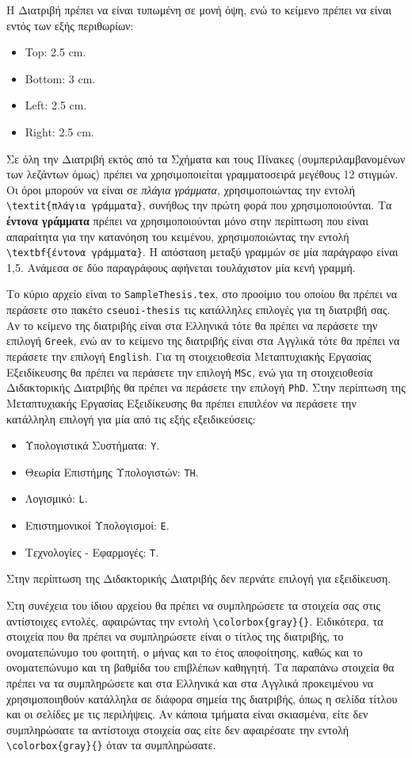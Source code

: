 Η Διατριβή πρέπει να είναι τυπωμένη σε μονή όψη, ενώ το κείμενο πρέπει να είναι εντός των εξής περιθωρίων:
\begin{itemize}
	\item Top: 2.5 cm.
	\item Bottom: 3 cm.
	\item Left: 2.5 cm.
	\item Right: 2.5 cm.
\end{itemize}
Σε όλη την Διατριβή εκτός από τα Σχήματα και τους Πίνακες (συμπεριλαμβανομένων των λεζάντων όμως) πρέπει να χρησιμοποιείται γραμματοσειρά μεγέθους 12 στιγμών.
Οι όροι μπορούν να είναι σε \textit{πλάγια γράμματα}, χρησιμοποιώντας την εντολή \verb|\textit{πλάγια γράμματα}|, συνήθως την πρώτη φορά που χρησιμοποιούνται.
Τα \textbf{έντονα γράμματα} πρέπει να χρησιμοποιούνται μόνο στην περίπτωση που είναι απαραίτητα για την κατανόηση του κειμένου, χρησιμοποιώντας την εντολή \verb|\textbf{έντονα γράμματα}|.
{\color{red}Η απόσταση μεταξύ γραμμών σε μία παράγραφο είναι 1,5.
Ανάμεσα σε δύο παραγράφους αφήνεται τουλάχιστον μία κενή γραμμή.}

Το κύριο αρχείο είναι το \texttt{SampleThesis.tex}, στο προοίμιο του οποίου θα πρέπει να περάσετε στο πακέτο \texttt{cseuoi-thesis} τις κατάλληλες επιλογές για τη διατριβή σας.
Αν το κείμενο της διατριβής είναι στα Ελληνικά τότε θα πρέπει να περάσετε την επιλογή \texttt{Greek}, ενώ αν το κείμενο της διατριβής είναι στα Αγγλικά τότε θα πρέπει να περάσετε την επιλογή \texttt{English}.
Για τη στοιχειοθεσία Μεταπτυχιακής Εργασίας Εξειδίκευσης θα πρέπει να περάσετε την επιλογή \texttt{MSc}, ενώ για τη στοιχειοθεσία Διδακτορικής Διατριβής θα πρέπει να περάσετε την επιλογή \texttt{PhD}.
Στην περίπτωση της Μεταπτυχιακής Εργασίας Εξειδίκευσης θα πρέπει επιπλέον να περάσετε την κατάλληλη επιλογή για μία από τις εξής εξειδικεύσεις:
\begin{itemize}
	\item Υπολογιστικά Συστήματα: \texttt{Y}.
	\item Θεωρία Επιστήμης Υπολογιστών: \texttt{TH}.
	\item Λογισμικό: \texttt{L}.
	\item Επιστημονικοί Υπολογισμοί: \texttt{E}.
	\item Τεχνολογίες - Εφαρμογές: \texttt{T}.
\end{itemize}
Στην περίπτωση της Διδακτορικής Διατριβής δεν περνάτε επιλογή για εξειδίκευση.

Στη συνέχεια του ίδιου αρχείου θα πρέπει να συμπληρώσετε τα στοιχεία σας στις αντίστοιχες εντολές, αφαιρώντας την εντολή \verb|\colorbox{gray}{}|.
Ειδικότερα, τα στοιχεία που θα πρέπει να συμπληρώσετε είναι ο τίτλος της διατριβής, το ονοματεπώνυμο του φοιτητή, ο μήνας και το έτος αποφοίτησης, καθώς και το ονοματεπώνυμο και τη βαθμίδα του επιβλέπων καθηγητή.
Τα παραπάνω στοιχεία θα πρέπει να τα συμπληρώσετε και στα Ελληνικά και στα Αγγλικά προκειμένου να χρησιμοποιηθούν κατάλληλα σε διάφορα σημεία της διατριβής, όπως η σελίδα τίτλου και οι σελίδες με τις περιλήψεις.
Αν κάποια τμήματα είναι σκιασμένα, είτε δεν συμπληρώσατε τα αντίστοιχα στοιχεία σας είτε δεν αφαιρέσατε την εντολή \verb|\colorbox{gray}{}| όταν τα συμπληρώσατε.

